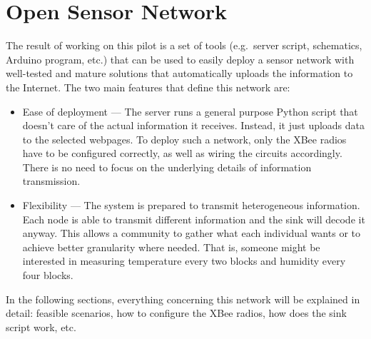 
\chapter{Open Sensor Network} %

\label{Chapter5} %



The result of working on this pilot is a set of tools (e.g.\ server script, schematics, Arduino program, etc.) that can be used to easily deploy a sensor network with well-tested and mature solutions that automatically uploads the information to the Internet. The two main features that define this network are:

\begin{itemize}
    \item Ease of deployment --- The server runs a general purpose Python script that doesn't care of the actual information it receives. Instead, it just uploads data to the selected webpages. To deploy such a network, only the XBee\textregistered{} radios have to be configured correctly, as well as wiring the circuits accordingly. There is no need to focus on the underlying details of information transmission.
    \item Flexibility --- The system is prepared to transmit heterogeneous information. Each node is able to transmit different information and the sink will decode it anyway. This allows a community to gather what each individual wants or to achieve better granularity where needed. That is, someone might be interested in measuring temperature every two blocks and humidity every four blocks.
\end{itemize}

In the following sections, everything concerning this network will be explained in detail: feasible scenarios, how to configure the XBee radios, how does the sink script work, etc.


